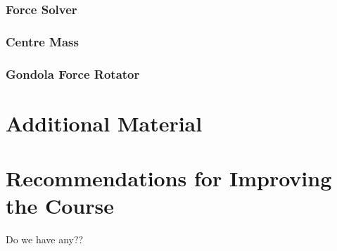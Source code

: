 \documentclass[]{book}
\begin{document}
\subsection{Force Solver} \label{code:forceSolver}

\subsection{Centre Mass} \label{code:CM}

\subsection{Gondola Force Rotator} \label{code:rotate}


\chapter{Additional Material}


















\begin{landscape}

\end{landscape}
\chapter{Recommendations for Improving the Course}
Do we have any??
\end{document}
